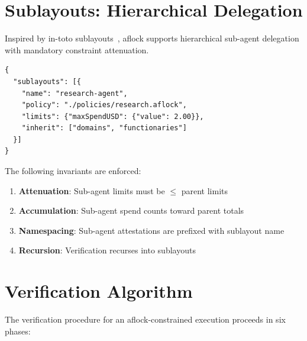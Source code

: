 \documentclass[11pt,a4paper]{article}
\begin{document}
\section{Sublayouts: Hierarchical Delegation}

Inspired by in-toto sublayouts~\cite{intoto}, aflock supports hierarchical sub-agent delegation with mandatory constraint attenuation.

\begin{lstlisting}[style=json]
{
  "sublayouts": [{
    "name": "research-agent",
    "policy": "./policies/research.aflock",
    "limits": {"maxSpendUSD": {"value": 2.00}},
    "inherit": ["domains", "functionaries"]
  }]
}
\end{lstlisting}

The following invariants are enforced:
\begin{enumerate}
    \item \textbf{Attenuation}: Sub-agent limits must be $\leq$ parent limits
    \item \textbf{Accumulation}: Sub-agent spend counts toward parent totals
    \item \textbf{Namespacing}: Sub-agent attestations are prefixed with sublayout name
    \item \textbf{Recursion}: Verification recurses into sublayouts
\end{enumerate}

\section{Verification Algorithm}

The verification procedure for an aflock-constrained execution proceeds in six phases:
\end{document}
